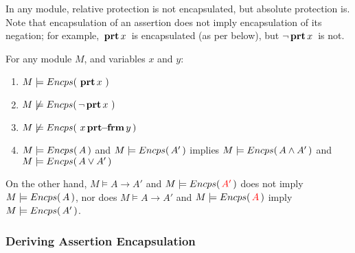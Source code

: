 In any module, relative protection %
is not encapsulated, but  absolute protection is.
 Note  that  encapsulation of an assertion does not imply encapsulation of its negation; 
 for example,  ${{\, \mathbf{prt}\, x\, }}$ is encapsulated (as per below), but $\neg  {{\ensuremath{\, \mathbf{prt}}\, x\, }}$ is not.


\begin{lemma}
For any module $M$, and variables $x$ and $y$:
\begin{enumerate} 
\item $M \models {\ensuremath Encps(\, {\ensuremath{\, \mathbf{prt}}\, x\, }\, )}$
\item $M \not\models {{\ensuremath Encps(\, \neg{\ensuremath{\, \mathbf{prt}}\, x\, }\, )}}$
\item $M \not\models {{\ensuremath Encps(\, {\ensuremath{\, x\, \mathbf{prt\!\!-\!\!frm}}\, y}\, )}}$
\item  $M \models  {\ensuremath Encps(\, A\, )}$ and $M \models  {\ensuremath Encps(\, A'\, )}$ implies 
$M \models  {\ensuremath Encps(\, A \wedge A'\, )}$ and $M \models  {\ensuremath Encps(\, A \vee A'\, )}$

\end{enumerate}
\end{lemma}

On the other hand,  $M \models A \rightarrow A'$ and $ M \models  {\ensuremath Encps(\,  \color{red}A' \color{black} \, )}$ does not  imply \ $M \models  {\ensuremath Encps(\, A\, )}$, nor does
$M \models A \rightarrow A'$ and 
 $ M \models  {\ensuremath Encps(\,  \color{red}A \color{black} \, )}$ imply \ $M \models  {\ensuremath Encps(\, A'\, )}$.

%

\subsubsection{Deriving  Assertion Encapsulation}

